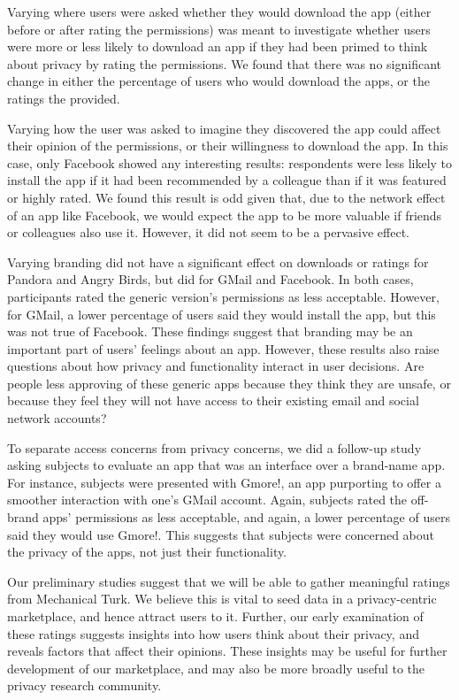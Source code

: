 \documentclass[11pt]{article}
\begin{document}
Varying where users were asked whether they would download the app 
(either before or after rating the permissions) was
meant to investigate whether users were more or less likely to
download an app if they had been primed to think about privacy by
rating the permissions. We found that there was no significant change
in either the percentage of users who would download the apps, or the
ratings the provided.

Varying how the user was asked to imagine they discovered the app
could affect their opinion of the permissions, or their willingness to
download the app. In this case, only Facebook showed any interesting
results: respondents were less likely to install the app if it
had been recommended by a colleague than if it was featured or highly
rated. We found this result is odd given that, due to the network
effect of an app like Facebook, we would expect the app to be more
valuable if friends or colleagues also use it. However, it did not
seem to be a pervasive effect.

Varying branding did not have a significant effect on downloads or
ratings for Pandora and Angry Birds, but did 
for GMail and Facebook. In both cases,
participants rated the generic version's permissions as less
acceptable. However, for GMail, a lower percentage of users said they
would install the app, but this was not true of Facebook.  These
findings suggest that branding may be an important part of users'
feelings about an app. However, these results also raise questions
about how privacy and functionality interact in user decisions. Are
people less approving of these generic apps because they think they
are unsafe, or because they feel they will not have access to their
existing email and social network accounts?

To separate access concerns from privacy concerns, we did a follow-up
study asking subjects to evaluate an app that was an
interface over a brand-name app. For instance,
subjects were presented with Gmore!, an app purporting to offer a
smoother interaction with one's GMail account. Again, subjects rated
the off-brand apps' permissions as less acceptable, and again, a lower
percentage of users said they would use Gmore!. This suggests that
subjects were concerned about the privacy of the apps, not just their
functionality.

Our preliminary studies suggest that we will be able to gather
meaningful ratings from Mechanical Turk. We believe this is vital
to seed data in a privacy-centric marketplace, and hence attract users
to it. Further, our early examination of these ratings 
suggests insights into how users think about their privacy, and reveals
factors that affect their opinions. These insights may be useful for
further development of our marketplace, and may also be more broadly
useful to the privacy research community.
\end{document}
